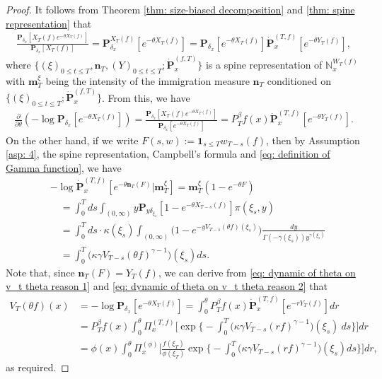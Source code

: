 \documentclass[12pt,a4paper]{amsart}
\theoremstyle{definition}
\numberwithin{equation}{section}
\begin{document}
\begin{proof}
	It follows from Theorem \ref{thm: size-biased decomposition} and \ref{thm: spine representation} that
  \begin{align}
    \frac{ \mathbf P_{\delta_x}[X_T(f)e^{-\theta X_T(f)}] } {  \mathbf P_{\delta_x} [X_T(f)] }
    = \mathbf P_{\delta_x}^{X_T(f)} [e^{-\theta X_T(f)}]
    = \mathbf P_{\delta_x} [e^{-\theta X_T(f)}] \dot {\mathbf P}_x^{(T,f)}[e^{-\theta Y_T(f)}],
\end{align}
where $\{(\xi)_{0\le t\le T}, \mathbf n_T, (Y)_{0\le t\le T}; \dot {\mathbf P}^{(f,T)}_x\}$ is a spine representation of $\mathbb N^{W_T(f)}_x$ with $\mathbf m^\xi_T$ being the intensity of the immigration measure $\mathbf n_T$ conditioned on $\{(\xi)_{0\le t\le T}; \dot {\mathbf P}^{(f,T)}_x\}$.
From this, we have
\begin{align} \label{eq: dynamic of theta on v_t theta reason 1}
	\frac{\partial}{\partial \theta}
	(-\log \mathbf P_{\delta_x}[e^{-\theta X_T(f)}])
	= \frac{\mathbf P_{\delta_x}[X_T(f)e^{-\theta X_T(f)}]}{\mathbf P_{\delta_x}[e^{-\theta X_T(f)}]}
	= P^\beta_T f(x) \dot {\mathbf P}_x^{(T,f)}[e^{-\theta Y_T(f)}].
\end{align}
On the other hand, if we write $F(s,w):= \mathbf 1_{s\leq T} w_{T-s}(f)$, then by Assumption \ref{asp: 4}, the spine representation, Campbell's formula and \eqref{eq: definition of Gamma function}, we have
\begin{align}\label{eq: dynamic of theta on v_t theta reason 2}
	&-\log \dot {\mathbf P}^{(T,f)}_{x}[e^{-\theta \mathbf n_T(F)}|\mathbf m_T^\xi]
   = \mathbf m_T^\xi(1-e^{-\theta F})
	\\ & \quad = \int_0^T ds \int_{(0,\infty)} y \mathbf P_{y\delta_{\xi_s}}[1- e^{-\theta X_{T-s}(f)}] \pi(\xi_s,y)
	\\ & \quad = \int_0^T ds \cdot \kappa(\xi_s) \int_{(0,\infty)} \mathbf (1- e^{- y V_{T-s}(\theta f)(\xi_s)}) \frac{dy}{\Gamma(-\gamma(\xi_s)) y^{\gamma(\xi_s)}}
	\\ & \quad = \int_0^T \big(\kappa\gamma V_{T-s}(\theta f)^{\gamma-1}\big)(\xi_s) ds.
\end{align}
Note that, since $\mathbf n_T(F)= Y_T(f)$, we can derive from \eqref{eq: dynamic of theta on v_t theta reason 1} and \eqref{eq: dynamic of theta on v_t theta reason 2} that
\begin{align}
	V_T(\theta f)(x)
	&= -\log \mathbf P_{\delta_x}[e^{-\theta X_T(f)}]
   = \int_0^\theta P^\beta_Tf(x)
   \dot {\mathbf P}_x^{(T,f)}[e^{-r  Y_T(f)}] dr
	\\ &=P^\beta_Tf(x)\int_0^\theta \Pi_x^{(T,f)} \Big[\exp\Big\{-\int_0^T \big(\kappa\gamma V_{T-s}(r f)^{\gamma-1}\big)(\xi_s)~ds\Big\}\Big] dr
	\\ &= \phi( x) \int_0^\theta \Pi_x^{(\phi)} \Big[ \frac{ f(\xi_T) } { \phi(\xi_T) } \exp\Big\{ - \int_0^T \big( \kappa \gamma V_{T-s} (r f)^{ \gamma - 1} \big) ( \xi_s) ds\Big\} \Big] dr,
\end{align}
as required.
\end{proof}
\end{document}
